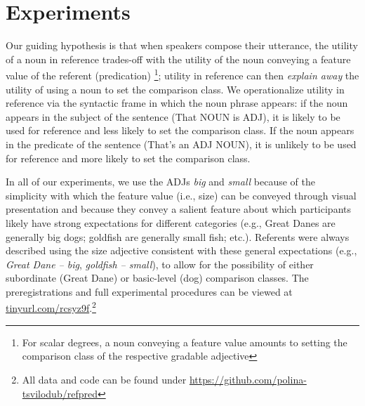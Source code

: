\documentclass[a4paper,man,natbib]{apa6}
\begin{document}
\section{Experiments}
Our guiding hypothesis is that when speakers compose their utterance, the utility of a noun in reference trades-off with the utility of the noun conveying a feature value of the referent (predication) \footnote{For scalar degrees, a noun conveying a feature value amounts to setting the comparison class of the respective gradable adjective}; utility in reference can then \emph{explain away} the utility of using a noun to set the comparison class. 
We operationalize utility in reference via the syntactic frame in which the noun phrase appears: if the noun appears in the subject of the sentence (That NOUN is ADJ), it is likely to be used for reference and less likely to set the comparison class. If the noun appears in the predicate of the sentence (That's an ADJ NOUN), it is unlikely to be used for reference and more likely to set the comparison class. 

In all of our experiments, we use the ADJs \emph{big} and \emph{small} because of the simplicity with which the feature value (i.e., size) can be conveyed through visual presentation and because they convey a salient feature about which participants likely have strong expectations for different categories (e.g., Great Danes are generally big dogs; goldfish are generally small fish; etc.). 
Referents were always described using the size adjective consistent with these general expectations (e.g., \emph{Great Dane -- big}, \emph{goldfish -- small}), to allow for the possibility of either subordinate (Great Dane) or basic-level (dog) comparison classes.
The preregistrations and full experimental procedures can be viewed at \url{tinyurl.com/rcsyz9f}.\footnote{All data and code can be found under \url{https://github.com/polina-tsvilodub/refpred}}

\end{document}
